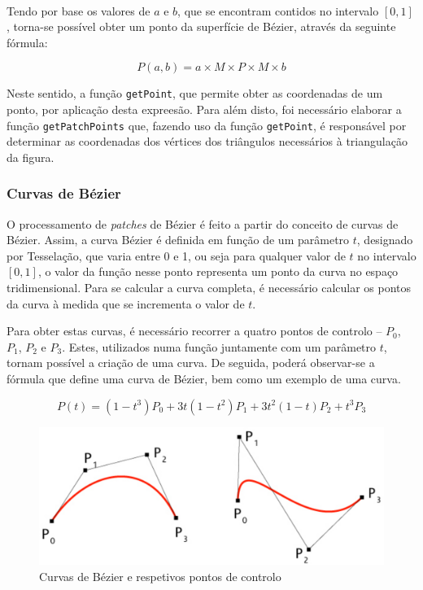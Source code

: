 \documentclass[a4paper, 11pt]{article}
\begin{document}
\

Tendo por base os valores de $a$ e $b$, que se encontram contidos no intervalo $\left[ 0, 1 
\right]$, torna-se possível obter um ponto da superfície de Bézier, através da seguinte 
fórmula:

$$P(a, b) = a \times M \times P \times M \times b$$

Neste sentido, a função \texttt{getPoint}, que permite obter as coordenadas de um ponto, por 
aplicação desta expreesão. Para além disto, foi necessário elaborar a função 
\texttt{getPatchPoints} que, fazendo uso da função \texttt{getPoint}, é responsável por 
determinar as coordenadas dos vértices dos triângulos necessários à triangulação da figura.

\subsubsection*{Curvas de Bézier}

O processamento de \textit{patches} de Bézier é feito a partir do conceito de curvas de Bézier. 
Assim, a curva Bézier é definida em função de um parâmetro $t$, designado por Tesselação, 
que varia entre 0 e 1, ou seja para qualquer valor de $t$ no intervalo $\left[ 0, 1 \right]$, o 
valor da função nesse ponto representa um ponto da curva no espaço tridimensional. Para se 
calcular a curva completa, é necessário calcular os pontos da curva à medida que se incrementa o 
valor de $t$.

Para obter estas curvas, é necessário recorrer a quatro pontos de controlo -- $P_0$, $P_1$, $P_2$ 
e $P_3$. Estes, utilizados numa função juntamente com um parâmetro $t$, tornam possível a 
criação de uma curva. De seguida, poderá observar-se a fórmula que define uma curva de Bézier, 
bem como um exemplo de uma curva.

$$P(t) = (1 - t^3)P_0 + 3t(1 - t^2)P_1 + 3t^2(1 - t)P_2 + t^3P_3$$

\begin{figure}[H]
    \centering
    \includegraphics[width=.7\textwidth]{img/bezier_curve.png}
    \caption{Curvas de Bézier e respetivos pontos de controlo}
\end{figure}
\end{document}
